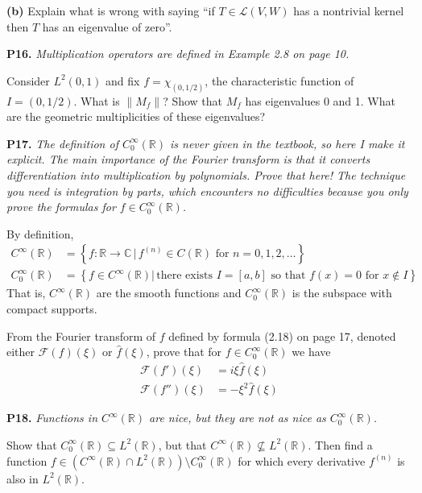\documentclass[12pt]{amsart}
\newcommand{\cF}{\mathcal{F}}
\newcommand{\cL}{\mathcal{L}}
\newcommand{\CC}{\mathbb{C}}
\newcommand{\RR}{\mathbb{R}}
\newcommand{\prob}[1]{\bigskip\noindent\textbf{#1.}\quad }
\newcommand{\epart}[1]{\medskip\noindent\textbf{(#1)}\quad }
\begin{document}
\epart{b}  Explain what is wrong with saying ``if $T\in\cL(V,W)$ has a nontrivial kernel then $T$ has an eigenvalue of zero''.


\prob{P16}  \emph{Multiplication operators are defined in Example 2.8 on page 10.}

\medskip
\noindent
Consider $L^2(0,1)$ and fix $f=\chi_{(0,1/2)}$, the characteristic function of $I=(0,1/2)$.  What is $\|M_f\|$?  Show that $M_f$ has eigenvalues 0 and 1.  What are the geometric multiplicities of these eigenvalues?


\clearpage\newpage
\prob{P17}  \emph{The definition of $C_0^\infty(\RR)$ is never given in the textbook, so here I make it explicit.  The main importance of the Fourier transform is that it converts differentiation into multiplication by polynomials.  Prove that here!  The technique you need is \emph{integration by parts}, which encounters no difficulties because you only prove the formulas for $f\in C_0^\infty(\RR)$.}

\medskip
\noindent
By definition,
\begin{align*}
C^\infty(\RR) &= \left\{f:\RR\to\CC\,\big|\, f^{(n)} \in C(\RR) \text{ for } n=0,1,2,\dots\right\} \\
C_0^\infty(\RR) &= \left\{f\in C^\infty(\RR)\big|\, \text{there exists $I=[a,b]$ so that $f(x)=0$ for $x\notin I$}\right\}
\end{align*}
That is, $C^\infty(\RR)$ are the smooth functions and $C_0^\infty(\RR)$ is the subspace with compact supports.

\medskip\noindent
From the Fourier transform of $f$ defined by formula (2.18) on page 17, denoted either $\cF(f)(\xi)$ or $\hat f(\xi)$, prove that for $f\in C_0^\infty(\RR)$ we have
\begin{align*}
\cF(f')(\xi) &= i\xi \hat f(\xi) \\
\cF(f'')(\xi) &= -\xi^2 \hat f(\xi)
\end{align*}


\prob{P18}  \emph{Functions in $C^\infty(\RR)$ are nice, but they are not as nice as $C_0^\infty(\RR)$.}

\medskip
\noindent
Show that $C_0^\infty(\RR) \subseteq L^2(\RR)$, but that $C^\infty(\RR) \nsubseteq L^2(\RR)$.  Then find a function $f \in \left(C^\infty(\RR) \cap L^2(\RR)\right) \setminus C_0^\infty(\RR)$ for which every derivative $f^{(n)}$ is also in $L^2(\RR)$.
\end{document}
